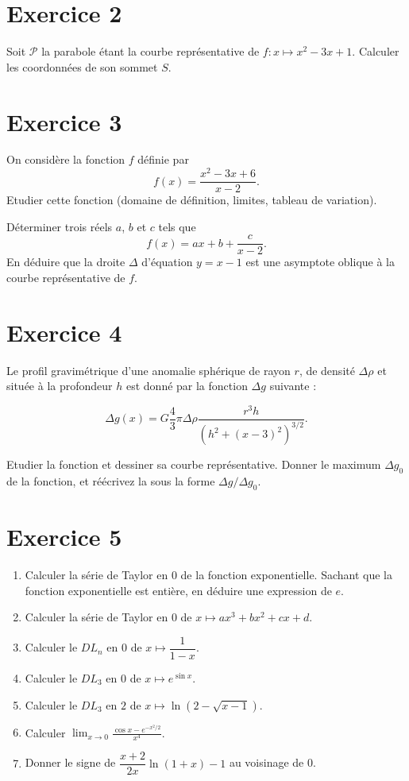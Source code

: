 \section*{Exercice 2}
Soit $\mathcal{P}$ la parabole étant la courbe représentative de $f\colon
x\mapsto x^2-3x+1$. Calculer les coordonnées de son sommet $S$.

\section*{Exercice 3}
On consid\`ere la fonction $f$ définie par 
\begin{equation}
  f(x)=\frac{x^2-3x+6}{x-2}.
\end{equation}
Etudier cette fonction (domaine de définition, limites, tableau de variation). 

Déterminer trois réels $a$, $b$ et $c$ tels que
\begin{equation}
  f(x)=ax+b+\frac{c}{x-2}.
\end{equation}
En déduire que la droite $\Delta$ d'équation $y=x-1$ est une asymptote oblique \`a la courbe
représentative de  $f$.

\section*{Exercice 4}
Le profil gravimétrique d'une anomalie sphérique de rayon $r$, de densité
$\Delta \rho$ et située à la profondeur $h$ est donné par la
fonction $\Delta g$ suivante :

\begin{equation}
  \Delta g(x)=G\frac{4}{3} \pi \Delta \rho \frac{r^3 h }{(h^2+(x-3)^2)^{3/2}}.
\end{equation}

Etudier la fonction et dessiner sa courbe représentative. Donner le maximum
$\Delta g_0$ de la fonction, et réécrivez la sous la forme $\Delta g/\Delta
g_0$.

\section*{Exercice 5}

\begin{enumerate}
    \item Calculer la série de Taylor en $0$ de la fonction exponentielle.
        Sachant que la fonction exponentielle est entière, en déduire une
        expression de $e$.
    \item Calculer la série de Taylor en $0$ de $x\mapsto ax^3+bx^2+cx+d$.
    \item Calculer le $DL_n$ en $0$ de $x\mapsto \dfrac{1}{1-x}$.
    \item Calculer le $DL_3$ en $0$ de $x\mapsto e^{\sin x}$.
    \item Calculer le $DL_3$ en $2$ de $x\mapsto \ln (2-\sqrt{x-1})$.
    \item Calculer ${\displaystyle\lim_{x\to 0}\frac{\cos x-e^{-x^2/2}}{x^4}}$.
    \item Donner le signe de $\dfrac{x+2}{2x}\ln(1+x)-1$ au voisinage de 0.
\end{enumerate}


